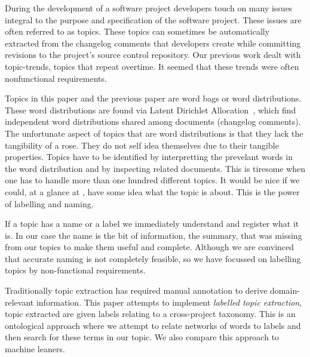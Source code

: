 \documentclass{acm_proc_article-sp}
\begin{document}
During the development of a software project developers touch on many issues integral to the purpose and specification of the software project. These issues are often referred to as topics. These topics can sometimes be automatically extracted from the changelog comments that developers create while committing revisions to the project's source control repository. Our previous work dealt with topic-trends, topics that repeat overtime. It seemed that these trends were often nonfunctional requirements. 

Topics in this paper and the previous paper are word bags or word distributions. These word distributions are found via Latent Dirichlet Allocation~\cite{Blei2003}, which find independent word distributions shared among documents (changelog comments). The unfortunate aspect of topics that are word distributions is that they lack the tangibility of a rose. They do not self idea themselves due to their tangible properties. Topics have to be identified by interpretting the prevelant words in the word distribution and by inspecting related documents. This is tiresome when one has to handle more than one hundred different topics. It would be nice if we could, at a glance at , have some idea what the topic is about. This is the power of labelling and naming.

If a topic has a name or a label we immediately understand and register what it is. In our case the name is the bit of information, the summary, that was missing from our topics to make them useful and complete. Although we are convinced that accurate naming is not completely feasible, so we have focussed on labelling topics by non-functional requirements.


Traditionally topic extraction has required manual annotation to derive domain-relevant information. This paper attempts to implement \emph{labelled topic extraction}, topic extracted are given labels relating to a cross-project taxonomy. This is an ontological approach where we attempt to relate networks of words to labels and then search for these terms in our topic. We also compare this approach to machine leaners.
\end{document}
